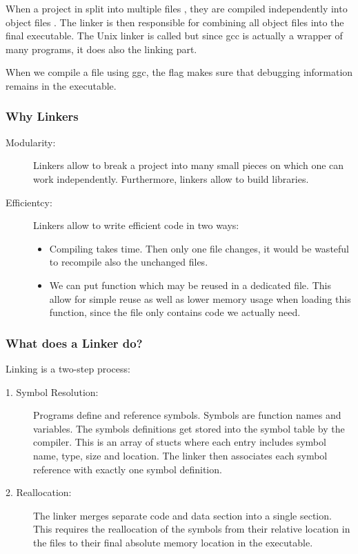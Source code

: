 
When a project in split into multiple files , they are compiled independently into object files . The linker is then responsible for combining all object files into the final executable. The Unix linker is called  but since gcc is actually a wrapper of many programs, it does also the linking part.

When we compile a file using ggc, the  flag makes sure that debugging information remains in the executable.

\subsubsection{Why Linkers}
\begin{description}
    \item[Modularity:] Linkers allow to break a project into many small pieces on which one can work independently. Furthermore, linkers allow to build libraries.
    \item[Efficientcy:] Linkers allow to write efficient code in two ways:
        \begin{itemize}
            \item Compiling takes time. Then only one file changes, it would be wasteful to recompile also the unchanged files. 
            \item We can put function which may be reused in a dedicated file. This allow for simple reuse as well as lower memory usage when loading this function, since the file only contains code we actually need.
        \end{itemize}
\end{description}

\subsubsection{What does a Linker do?}
Linking is a two-step process:
\begin{description}
    \item[1. Symbol Resolution:] Programs define and reference symbols. Symbols are function names and variables. The symbols definitions get stored into the symbol table by the compiler. This is an array of stucts where each entry includes symbol name, type, size and location. The linker then associates each symbol reference with exactly one symbol definition.
    \item[2. Reallocation:] The linker merges separate code and data section into a single section. This requires the reallocation of the symbols from their relative location in the  files to their final absolute memory location in the executable.
\end{description}

